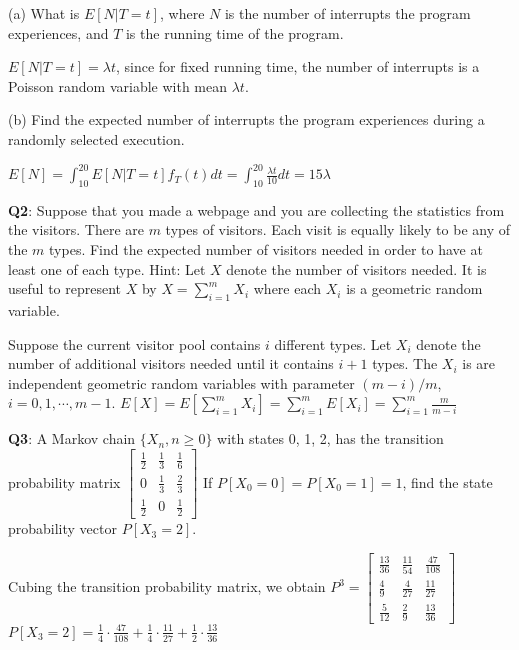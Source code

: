\documentclass{scrartcl}
\begin{document}
\begin{multicols*}{3}
(a) What is $E[N|T = t]$, where $N$ is the number of interrupts the program experiences, and $T$ is the running time of the program.

$E[N|T = t] = \lambda t$, since for fixed running time, the number of interrupts is a Poisson random variable with mean $\lambda t$.

(b) Find the expected number of interrupts the program experiences during a randomly
selected execution.

$E[N] = \int_{10}^{20} E[N|T=t]f_T(t)dt = \int_{10}^{20}\frac{\lambda t}{10}dt = 15\lambda$



{\bf Q2}: Suppose that you made a webpage and you are collecting the statistics from the visitors. There are $m$ types of visitors. Each visit is equally likely to be any of the $m$ types. Find the expected number of visitors needed in order to have at least one of each type. Hint: Let $X$ denote the number of visitors needed. It is useful to represent $X$ by $X=\sum_{i=1}^mX_i$ where each $X_i$ is a geometric random variable.

Suppose the current visitor pool contains $i$ different types. Let $X_i$ denote the number of additional visitors needed until it contains $i + 1$ types. The $X_i$ is are independent geometric random variables with parameter $(m - i)/m$, $i = 0, 1, \cdots, m-1$. $E[X]=E[\sum_{i=1}^mX_i]=\sum_{i=1}^mE[X_i]=\sum_{i=1}^m\frac{m}{m-i}$



{\bf Q3}: A Markov chain $\{X_n,n \geq 0\}$ with states 0, 1, 2, has the transition probability matrix $\begin{bmatrix}\frac{1}{2} & \frac{1}{3} & \frac{1}{6} \\ 0 & \frac{1}{3} & \frac{2}{3} \\ \frac{1}{2} & 0 & \frac{1}{2}\end{bmatrix}$ If $P[X_0 = 0] = P[X_0 = 1] = 1$, find the state probability vector $P[X_3 = 2]$.

Cubing the transition probability matrix, we obtain $P^3 = \begin{bmatrix}\frac{13}{36} & \frac{11}{54} & \frac{47}{108} \\ \frac{4}{9} & \frac{4}{27} & \frac{11}{27} \\ \frac{5}{12} & \frac{2}{9} & \frac{13}{36}\end{bmatrix}$
$P[X_3=2]=\frac{1}{4}\cdot\frac{47}{108}+\frac{1}{4}\cdot\frac{11}{27}+\frac{1}{2}\cdot\frac{13}{36}$




\end{multicols*}
\end{document}
